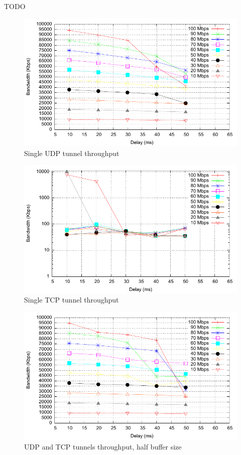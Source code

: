 TODO

\begin{figure}
  \centering
  \includegraphics[width=\textwidth]{img/test-udp}
  \caption{Single UDP tunnel throughput}
  \label{fig:udp}
\end{figure}

\begin{figure}
  \centering
  \includegraphics[width=\textwidth]{img/test-tcp}
  \caption{Single TCP tunnel throughput}
  \label{fig:tcp}
\end{figure}

\begin{figure}
  \centering
  \includegraphics[width=\textwidth]{img/test-mptcp-05}
  \caption{UDP and TCP tunnels throughput, half buffer size}
  \label{fig:mptcp-0.5}
\end{figure}


